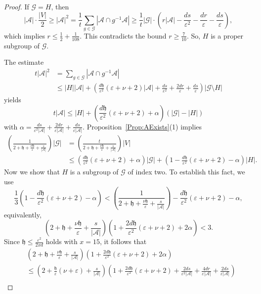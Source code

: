 \documentclass[ALCO,Unicode,published]{cedram}
\newcommand{\mo}{{-1}}
\newcommand{\calG}{\ensuremath{\mathcal{G}}}
\newcommand{\scrA}{\ensuremath{\mathscr{A}}}
\newcommand{\tth}{\ensuremath{\mathfrak{h}}}
\begin{document}
\begin{proof}
If $\calG = H$, then 
$$|\scrA| \cdot \frac{|V|}{2} 
\geq |\scrA|^2 = \frac 1t \sum_{g\in \calG} |\scrA\cap g^\mo \scrA|
\geq \frac 1t |\calG| \cdot 
\left(r|\scrA|  - \frac{ds}{\varepsilon^2} 
- \frac{dr}{\varepsilon}
- \frac{ds}{\varepsilon}
\right),$$
which implies $r \leq \frac 12 + \frac 1{108}$. This contradicts the bound $r \geq \frac 7 {10}$. So, $H$ is a proper subgroup of $\calG$. 

The estimate 
\begin{align*}
t |\scrA|^2 
&= \sum_{g\in \calG} |\scrA\cap g^\mo \scrA| \\
&\leq |H| |\scrA| + \left(
\frac{d\tth}{\varepsilon^2}(\varepsilon + \nu+ 2)|\scrA|
+ \frac{ds}{\varepsilon^2} + \frac{2dr}\varepsilon + \frac{ds}{\varepsilon}
\right)
|\calG\setminus H|
\end{align*}
yields
$$t |\scrA|  
\leq |H| + 
\left(
\frac{d\tth}{\varepsilon^2}(\varepsilon + \nu+ 2)
+ 
\alpha
\right)
(|\calG| - |H|)$$
with $\alpha  = \frac{ds}{\varepsilon^2|\scrA|} + \frac{2dr}{\varepsilon |\scrA|} + \frac{ds}{\varepsilon |\scrA|}$. 
Proposition~\ref{Prop:AExists}(1) implies
\begin{align*}
\left(\frac{1}{2+ \tth + \frac{\nu\tth}{\varepsilon} +\frac{s}{|\scrA|}}\right) |\calG| 
& = \left(\frac{t}{2+ \tth + \frac{\nu\tth}{\varepsilon} + \frac{s}{|\scrA|}}\right) |V| \\
&\leq 
 \left(
\frac{d\tth}{\varepsilon^2}(\varepsilon + \nu+ 2)
+ 
\alpha
\right)|\calG| 
+  \left(1 - \frac{d\tth}{\varepsilon^2}(\varepsilon + \nu+ 2)
- \alpha
\right) |H|.
\end{align*}
Now we show that $H$ is a subgroup of $\calG$ of index two. To establish this fact, we use 
\[\frac 13 \left(1 - \frac{d\tth}{\varepsilon^2}(\varepsilon + \nu+ 2) - \alpha \right)
< 
\left(\frac{1}{2+ \tth + \frac{\nu\tth}{\varepsilon}+ \frac{s}{|\scrA|}}\right) - \frac{d\tth}{\varepsilon^2}(\varepsilon + \nu+ 2) - \alpha,\]
equivalently, 
$$\left(2 + \tth + \frac{\nu\tth}{\varepsilon} +\frac{s}{|\scrA|}\right) \left( 1 + \frac{2d\tth}{\varepsilon^2}(\varepsilon + \nu+ 2) + 2\alpha \right) < 3.$$
Since $\tth\leq  \frac{\varepsilon^{2}}{2x d}$ holds with $x= 15$, it follows that  
\begin{align*}
& \left(2 + \tth + \frac{\nu\tth}{\varepsilon} + \frac{s}{|\scrA|}\right) \left( 1 + \frac{2d\tth}{\varepsilon^2}(\varepsilon + \nu+ 2) +
2\alpha \right)\\
& 
\leq 
\left(2 + \frac{\tth}{\varepsilon} (\nu + \varepsilon) + \frac{s}{|\scrA|}\right) \left( 1 + \frac{2d\tth}{\varepsilon^2}(\varepsilon + \nu+ 2) + \frac{2ds}{\varepsilon^2|\scrA|} + \frac{4dr}{\varepsilon |\scrA| } + \frac{2ds}{\varepsilon |\scrA|} \right)\\

\end{align*}
\end{proof}
\end{document}
